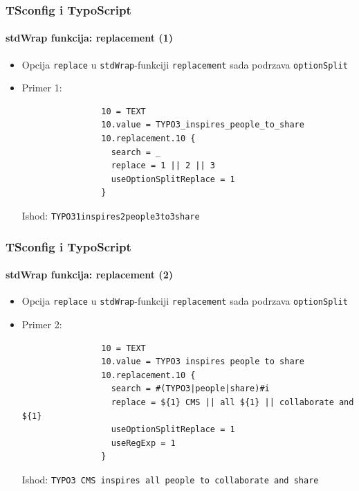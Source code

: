 \begin{frame}[fragile]
	\frametitle{TSconfig i TypoScript}
	\framesubtitle{stdWrap funkcija: replacement (1)}

	\begin{itemize}
		\item Opcija \texttt{replace} u \texttt{stdWrap}-funkciji \texttt{replacement}\newline
			sada podrzava \texttt{optionSplit}

		\item Primer 1:

			\begin{lstlisting}
				10 = TEXT
				10.value = TYPO3_inspires_people_to_share
				10.replacement.10 {
				  search = _
				  replace = 1 || 2 || 3
				  useOptionSplitReplace = 1
				}
			\end{lstlisting}

			Ishod:\newline
				\texttt{TYPO31inspires2people3to3share}

	\end{itemize}

\end{frame}


\begin{frame}[fragile]
	\frametitle{TSconfig i TypoScript}
	\framesubtitle{stdWrap funkcija: replacement (2)}

	\begin{itemize}
		\item Opcija \texttt{replace} u \texttt{stdWrap}-funkciji \texttt{replacement}\newline
			sada podrzava \texttt{optionSplit}

		\item Primer 2:

			\begin{lstlisting}
				10 = TEXT
				10.value = TYPO3 inspires people to share
				10.replacement.10 {
				  search = #(TYPO3|people|share)#i
				  replace = ${1} CMS || all ${1} || collaborate and ${1}
				  useOptionSplitReplace = 1
				  useRegExp = 1
				}
			\end{lstlisting}

			Ishod:\newline
				\texttt{TYPO3 CMS inspires all people to collaborate and share}

	\end{itemize}

\end{frame}

